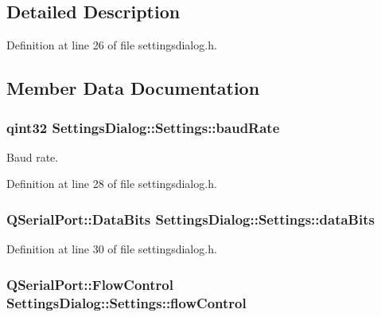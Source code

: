 \subsection{Detailed Description}


Definition at line 26 of file settingsdialog.\+h.



\subsection{Member Data Documentation}
\hypertarget{struct_settings_dialog_1_1_settings_ac19cc9431552857a75c657a464ba0700}{}
\subsubsection[{baud\+Rate}]{\setlength{\rightskip}{0pt plus 5cm}qint32 Settings\+Dialog\+::\+Settings\+::baud\+Rate}\label{struct_settings_dialog_1_1_settings_ac19cc9431552857a75c657a464ba0700}


Baud rate. 



Definition at line 28 of file settingsdialog.\+h.

\hypertarget{struct_settings_dialog_1_1_settings_a7dcd85d028a09508cb4567cf631b40e9}{}
\subsubsection[{data\+Bits}]{\setlength{\rightskip}{0pt plus 5cm}Q\+Serial\+Port\+::\+Data\+Bits Settings\+Dialog\+::\+Settings\+::data\+Bits}\label{struct_settings_dialog_1_1_settings_a7dcd85d028a09508cb4567cf631b40e9}


Definition at line 30 of file settingsdialog.\+h.

\hypertarget{struct_settings_dialog_1_1_settings_aa962a6e7dbb8338af154305e4ff46cfc}{}
\subsubsection[{flow\+Control}]{\setlength{\rightskip}{0pt plus 5cm}Q\+Serial\+Port\+::\+Flow\+Control Settings\+Dialog\+::\+Settings\+::flow\+Control}\label{struct_settings_dialog_1_1_settings_aa962a6e7dbb8338af154305e4ff46cfc}


